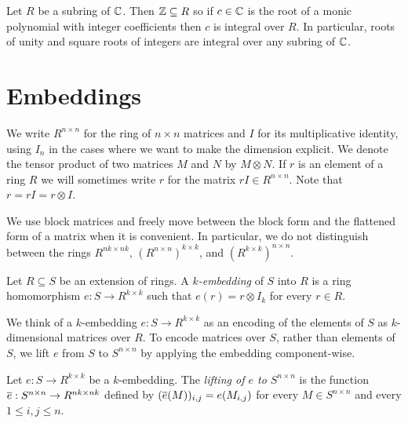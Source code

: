 \documentclass{article}
\begin{document}
\begin{example}
  Let $R$ be a subring of $\mathbb{C}$. Then $\mathbb{Z}\subseteq R$ so if $c\in\mathbb{C}$ is
  the root of a monic polynomial with integer coefficients then $c$ is
  integral over $R$. In particular, roots of unity and square roots of
  integers are integral over any subring of $\mathbb{C}$.
\end{example}

\section{Embeddings}

We write $R^{n\times n}$ for the ring of $n\times n$ matrices and $I$
for its multiplicative identity, using $I_n$ in the cases where we
want to make the dimension explicit. We denote the tensor product of
two matrices $M$ and $N$ by $M\otimes N$. If $r$ is an element of a
ring $R$ we will sometimes write $r$ for the matrix $rI \in R^{n\times
  n}$. Note that $r=rI=r\otimes I$.

We use block matrices and freely move between the block form and the
flattened form of a matrix when it is convenient. In particular, we do
not distinguish between the rings $R^{nk\times nk}$, $(R^{n\times
  n})^{k\times k}$, and $(R^{k\times k})^{n\times n}$.

\begin{definition}
  \label{def:kemb}
  Let $R\subseteq S$ be an extension of rings. A \emph{$k$-embedding}
  of $S$ into $R$ is a ring homomorphism $e:S\to R^{k\times k}$ such
  that $e(r) = r\otimes I_k$ for every $r\in R$.
\end{definition}


We think of a $k$-embedding $e:S\to R^{k\times k}$ as an encoding of
the elements of $S$ as $k$-dimensional matrices over $R$. To encode
matrices over $S$, rather than elements of $S$, we lift $e$ from $S$
to $S^{n\times n}$ by applying the embedding component-wise.

\begin{definition}
  \label{def:klift}
  Let $e:S\to R^{k\times k}$ be a $k$-embedding. The \emph{lifting of
    $e$ to $S^{n\times n}$} is the function $\overline{e} :S^{n\times n} \to
  R^{nk\times nk}$ defined by $(\overline{e} (M))_{i,j} = e(M_{i,j})$ for
  every $M\in S^{n\times n}$ and every $1\leq i,j\leq n$.
\end{definition}
\end{document}
